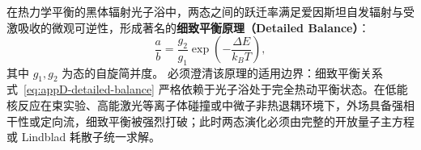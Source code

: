 在热力学平衡的黑体辐射光子浴中，两态之间的跃迁率满足爱因斯坦自发辐射与受激吸收的微观可逆性，形成著名的\textbf{细致平衡原理（Detailed Balance）}：
\begin{equation}\label{eq:appD-detailed-balance}
\frac{a}{b} = \frac{g_2}{g_1} \exp\left( -\frac{\Delta E}{k_B T} \right),
\end{equation}
其中 $g_1, g_2$ 为态的自旋简并度。
必须澄清该原理的适用边界：细致平衡关系式~\eqref{eq:appD-detailed-balance} 严格依赖于光子浴处于完全热动平衡状态。在低能核反应在束实验、高能激光等离子体碰撞或中微子非热退耦环境下，外场具备强相干性或定向流，细致平衡被强烈打破；此时两态演化必须由完整的开放量子主方程或 Lindblad 耗散子统一求解。
